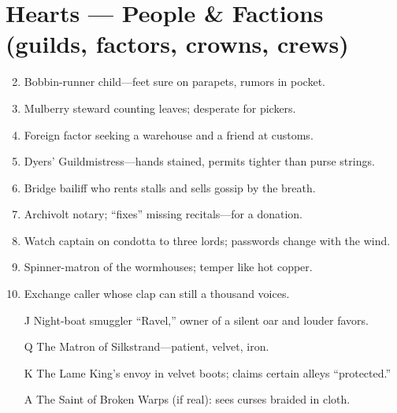\section*{Hearts --- People \& Factions (guilds, factors, crowns, crews)}
\begin{enumerate}
\setcounter{enumi}{1}
\item Bobbin-runner child---feet sure on parapets, rumors in pocket.
\item Mulberry steward counting leaves; desperate for pickers.
\item Foreign factor seeking a warehouse and a friend at customs.
\item Dyers' Guildmistress---hands stained, permits tighter than purse strings.
\item Bridge bailiff who rents stalls and sells gossip by the breath.
\item Archivolt notary; ``fixes'' missing recitals---for a donation.
\item Watch captain on condotta to three lords; passwords change with the wind.
\item Spinner-matron of the wormhouses; temper like hot copper.
\item Exchange caller whose clap can still a thousand voices.
\item[J] Night-boat smuggler ``Ravel,'' owner of a silent oar and louder favors.
\item[Q] The Matron of Silkstrand---patient, velvet, iron.
\item[K] The Lame King's envoy in velvet boots; claims certain alleys ``protected.''
\item[A] The Saint of Broken Warps (if real): sees curses braided in cloth.
\end{enumerate}

